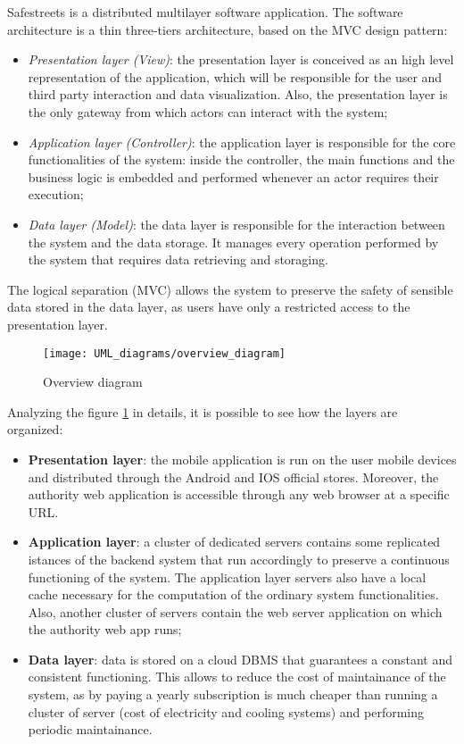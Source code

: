 Safestreets is a distributed multilayer software application. The software architecture is a thin three-tiers architecture, based on the MVC design pattern:
\begin{itemize}
    \item \textit{Presentation layer (View)}: the presentation layer is conceived as an high level representation of the application, which will be responsible for the user and third party interaction and data visualization. Also, the presentation layer is the only gateway from which actors can interact with the system;
    \item \textit{Application layer (Controller)}: the application layer is responsible for the core functionalities of the system: inside the controller, the main functions and the business logic is embedded and performed whenever an actor requires their execution;
    \item \textit{Data layer (Model)}: the data layer is responsible for the interaction between the system and the data storage. It manages every operation performed by the system that requires data retrieving and storaging.
\end{itemize}
The logical separation (MVC) allows the system to preserve the safety of sensible data stored in the data layer, as users have only a restricted access to the presentation layer.
\begin{figure}[H]
    \centering
    \texttt{[image: UML\_diagrams/overview\_diagram]}
    \caption{Overview diagram}
    \label{fig:overview_diagram}
\end{figure}
Analyzing the figure \ref{fig:overview_diagram} in details, it is possible to see how the layers are organized:
\begin{itemize}
    \item \textbf{Presentation layer}: the mobile application is run on the user mobile devices and distributed through the Android and IOS official stores. Moreover, the authority web application is accessible through any web browser at a specific URL.
    \item \textbf{Application layer}: a cluster of dedicated servers contains some replicated istances of the backend system that run accordingly to preserve a continuous functioning of the system. The application layer servers also have a local cache necessary for the computation of the ordinary system functionalities. Also, another cluster of servers contain the web server application on which the authority web app runs; 
    \item \textbf{Data layer}: data is stored on a cloud DBMS that guarantees a constant and consistent functioning. This allows to reduce the cost of maintainance of the system, as by paying a yearly subscription is much cheaper than running a cluster of server (cost of electricity and cooling systems) and performing periodic maintainance.
\end{itemize} 
